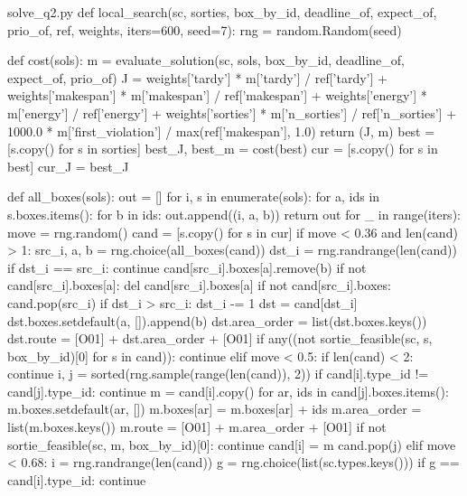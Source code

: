 \documentclass[bwprint]{gmcmthesis}
\begin{document}
\begin{appendices}
\begin{Python}{solve\_q2.py}
def local_search(sc, sorties, box_by_id, deadline_of, expect_of, prio_of, ref, weights, iters=600, seed=7):
    rng = random.Random(seed)

    def cost(sols):
        m = evaluate_solution(sc, sols, box_by_id, deadline_of, expect_of, prio_of)
        J = weights['tardy'] * m['tardy'] / ref['tardy'] + weights['makespan'] * m['makespan'] / ref['makespan'] + weights['energy'] * m['energy'] / ref['energy'] + weights['sorties'] * m['n_sorties'] / ref['n_sorties'] + 1000.0 * m['first_violation'] / max(ref['makespan'], 1.0)
        return (J, m)
    best = [s.copy() for s in sorties]
    best_J, best_m = cost(best)
    cur = [s.copy() for s in best]
    cur_J = best_J

    def all_boxes(sols):
        out = []
        for i, s in enumerate(sols):
            for a, ids in s.boxes.items():
                for b in ids:
                    out.append((i, a, b))
        return out
    for _ in range(iters):
        move = rng.random()
        cand = [s.copy() for s in cur]
        if move < 0.36 and len(cand) > 1:
            src_i, a, b = rng.choice(all_boxes(cand))
            dst_i = rng.randrange(len(cand))
            if dst_i == src_i:
                continue
            cand[src_i].boxes[a].remove(b)
            if not cand[src_i].boxes[a]:
                del cand[src_i].boxes[a]
            if not cand[src_i].boxes:
                cand.pop(src_i)
                if dst_i > src_i:
                    dst_i -= 1
            dst = cand[dst_i]
            dst.boxes.setdefault(a, []).append(b)
            dst.area_order = list(dst.boxes.keys())
            dst.route = [O01] + dst.area_order + [O01]
            if any((not sortie_feasible(sc, s, box_by_id)[0] for s in cand)):
                continue
        elif move < 0.5:
            if len(cand) < 2:
                continue
            i, j = sorted(rng.sample(range(len(cand)), 2))
            if cand[i].type_id != cand[j].type_id:
                continue
            m = cand[i].copy()
            for ar, ids in cand[j].boxes.items():
                m.boxes.setdefault(ar, [])
                m.boxes[ar] = m.boxes[ar] + ids
            m.area_order = list(m.boxes.keys())
            m.route = [O01] + m.area_order + [O01]
            if not sortie_feasible(sc, m, box_by_id)[0]:
                continue
            cand[i] = m
            cand.pop(j)
        elif move < 0.68:
            i = rng.randrange(len(cand))
            g = rng.choice(list(sc.types.keys()))
            if g == cand[i].type_id:
                continue

\end{Python}
\end{appendices}
\end{document}

